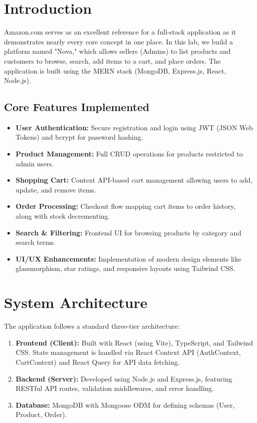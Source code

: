 \documentclass[11pt, a4paper]{article}
\begin{document}
\section{Introduction}
Amazon.com serves as an excellent reference for a full-stack application as it demonstrates nearly every core concept in one place. In this lab, we build a platform named "Nova," which allows sellers (Admins) to list products and customers to browse, search, add items to a cart, and place orders. The application is built using the MERN stack (MongoDB, Express.js, React, Node.js).

\subsection{Core Features Implemented}
\begin{itemize}
    \item \textbf{User Authentication:} Secure registration and login using JWT (JSON Web Tokens) and bcrypt for password hashing.
    \item \textbf{Product Management:} Full CRUD operations for products restricted to admin users.
    \item \textbf{Shopping Cart:} Context API-based cart management allowing users to add, update, and remove items.
    \item \textbf{Order Processing:} Checkout flow mapping cart items to order history, along with stock decrementing.
    \item \textbf{Search \& Filtering:} Frontend UI for browsing products by category and search terms.
    \item \textbf{UI/UX Enhancements:} Implementation of modern design elements like glassmorphism, star ratings, and responsive layouts using Tailwind CSS.
\end{itemize}

\section{System Architecture}
The application follows a standard three-tier architecture:

\begin{enumerate}
    \item \textbf{Frontend (Client):} Built with React (using Vite), TypeScript, and Tailwind CSS. State management is handled via React Context API (AuthContext, CartContext) and React Query for API data fetching.
    \item \textbf{Backend (Server):} Developed using Node.js and Express.js, featuring RESTful API routes, validation middlewares, and error handling.
    \item \textbf{Database:} MongoDB with Mongoose ODM for defining schemas (User, Product, Order).
\end{enumerate}
\end{document}
